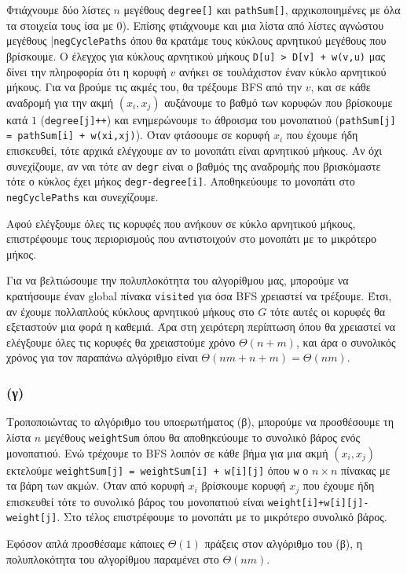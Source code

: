 \documentclass[a4paper,11pt]{article}
\begin{document}
Φτιάχνουμε δύο λίστες $n$ μεγέθους \verb|degree[]| και \verb|pathSum[]|, αρχικοποιημένες με όλα τα στοιχεία τους ίσα με $0$). Επίσης φτιάχνουμε και μια λίστα από λίστες αγνώστου μεγέθους |\verb|negCyclePaths| όπου θα κρατάμε τους κύκλους αρνητικού μεγέθους που βρίσκουμε.
Ο έλεγχος για κύκλους αρνητικού μήκους \verb|D[u] > D[v] + w(v,u)| μας δίνει την πληροφορία ότι η κορυφή $v$ ανήκει σε τουλάχιστον έναν κύκλο αρνητικού μήκους.
Για να βρούμε τις ακμές του, θα τρέξουμε BFS από την $v$, και σε κάθε αναδρομή για την ακμή $(x_i, x_j)$ αυξάνουμε το βαθμό των κορυφών που βρίσκουμε κατά $1$ (\verb|degree[j]++|) και ενημερώνουμε τo άθροισμα του μονοπατιού (\verb|pathSum[j] = pathSum[i] + w(xi,xj)|).
Όταν φτάσουμε σε κορυφή $x_i$ που έχουμε ήδη επισκευθεί, τότε αρχικά ελέγχουμε αν το μονοπάτι είναι αρνητικού μήκους.
Αν όχι συνεχίζουμε, αν ναι τότε αν \verb|degr| είναι ο βαθμός της αναδρομής που βρισκόμαστε τότε ο κύκλος έχει μήκος \verb|degr-degree[i]|. Αποθηκεύουμε το μονοπάτι στο \verb|negCyclePaths| και συνεχίζουμε.

Αφού ελέγξουμε όλες τις κορυφές που ανήκουν σε κύκλο αρνητικού μήκους, επιστρέφουμε τους περιορισμούς που αντιστοιχούν στο μονοπάτι με το μικρότερο μήκος.

Για να βελτιώσουμε την πολυπλοκότητα του αλγορίθμου μας, μπορούμε να κρατήσουμε έναν global πίνακα \verb|visited| για όσα BFS χρειαστεί να τρέξουμε.
Έτσι, αν έχουμε πολλαπλούς κύκλους αρνητικού μήκους στο $G$ τότε αυτές οι κορυφές θα εξεταστούν μια φορά η καθεμιά.
Άρα στη χειρότερη περίπτωση όπου θα χρειαστεί να ελέγξουμε όλες τις κορυφές θα χρειαστούμε χρόνο $\Theta(n+m)$, και άρα ο συνολικός χρόνος για τον παραπάνω αλγόριθμο είναι $\Theta(nm+n+m)=\Theta(nm)$.

\subsubsection*{(γ)}
Τροποποιώντας το αλγόριθμο του υποερωτήματος (β), μπορούμε να προσθέσουμε τη λίστα $n$ μεγέθους \verb|weightSum| όπου θα αποθηκεύουμε το συνολικό βάρος ενός μονοπατιού.
Ενώ τρέχουμε το BFS λοιπόν σε κάθε βήμα για μια ακμή $(x_i, x_j)$ εκτελούμε \verb|weightSum[j] = weightSum[i] + w[i][j]| όπου \verb|w| ο $n\times n$ πίνακας με τα βάρη των ακμών.
Όταν από κορυφή $x_i$ βρίσκουμε κορυφή $x_j$ που έχουμε ήδη επισκευθεί τότε το συνολικό βάρος του μονοπατιού είναι \verb|weight[i]+w[i][j]-weight[j]|.
Στο τέλος επιστρέφουμε το μονοπάτι με το μικρότερο συνολικό βάρος.

Εφόσον απλά προσθέσαμε κάποιες $\Theta(1)$ πράξεις στον αλγόριθμο του (β), η πολυπλοκότητα του αλγορίθμου παραμένει στο $\Theta(nm)$.
\end{document}
